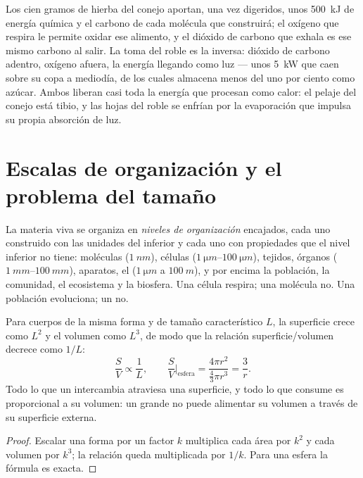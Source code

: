 \begin{example}\label{ex:b1:organism-environment:rabbitoak}
Los cien gramos de hierba del conejo aportan, una vez digeridos, unos
\qty{500}{kJ} de energía química y el carbono de cada molécula que
construirá; el oxígeno que respira le permite oxidar ese alimento, y el
dióxido de carbono que exhala es ese mismo carbono al salir. La toma del
roble es la inversa: dióxido de carbono adentro, oxígeno afuera, la energía
llegando como luz --- unos \qty{5}{kW} que caen sobre su copa a mediodía, de
los cuales almacena menos del uno por ciento como azúcar. Ambos liberan casi
toda la energía que procesan como calor: el pelaje del conejo está tibio, y
las hojas del roble se enfrían por la evaporación que impulsa su propia
absorción de luz.
\end{example}

\section{Escalas de organización y el problema del tamaño}

\begin{definition}\label{def:b1:organism-environment:levels}
La materia viva se organiza en \emph{niveles de
organización} encajados, cada uno construido
con las unidades del inferior y cada uno con propiedades que el nivel
inferior no tiene: moléculas ($\qty{1}{nm}$), células
($\qtyrange{1}{100}{\micro m}$), tejidos, órganos
($\qtyrange{1}{100}{mm}$), aparatos, el  ($\qty{1}{\micro m}$ a
$\qty{100}{m}$), y por encima la población, la comunidad, el ecosistema y
la biosfera. Una célula respira; una molécula no. Una población evoluciona;
un  no.
\end{definition}

\begin{proposition}\label{prop:b1:organism-environment:sv}
Para cuerpos de la misma forma y de tamaño característico $L$, la superficie
crece como $L^2$ y el volumen como $L^3$, de modo que la relación
superficie/volumen decrece como $1/L$:
\[
\frac{S}{V} \propto \frac{1}{L}, \qquad
\frac{S}{V}\Big|_{\text{esfera}} = \frac{4\pi r^2}{\tfrac{4}{3}\pi r^3} = \frac{3}{r}.
\]
Todo lo que un  intercambia atraviesa una superficie, y todo lo que
consume es proporcional a su volumen: un  grande no puede alimentar
su volumen a través de su superficie externa.
\end{proposition}
\begin{proof}
Escalar una forma por un factor $k$ multiplica cada área por $k^2$ y cada
volumen por $k^3$; la relación queda multiplicada por $1/k$. Para una esfera
la fórmula es exacta.
\end{proof}

